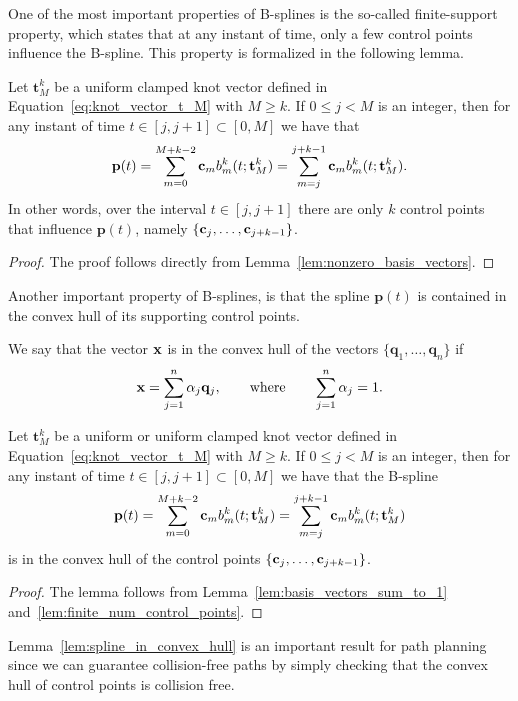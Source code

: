 One of the most important properties of B-splines is the so-called finite-support property, which states that at any instant of time, only a few control points influence the B-spline.  This property is formalized in the following lemma.
\begin{lemma}\label{lem:finite_num_control_points}
	Let $\mathbf{t}_M^k$ be a uniform clamped knot vector defined in Equation~\eqref{eq:knot_vector_t_M} with $M\geq k$. If $0\leq j < M$ is an integer, then for any instant of time $t\in[j, j+1]\subset [0, M]$ we have that
	\[
	\mathbf{p}(t) = \sum_{m=0}^{M+k-2} \mathbf{c}_m b_m^k(t; \mathbf{t}_M^k) = \sum_{m=j}^{j+k-1} \mathbf{c}_m b_m^k(t; \mathbf{t}_M^k).
	\]
	In other words, over the interval $t\in[j, j+1]$ there are only $k$ control points that influence $\mathbf{p}(t)$, namely
	$\{\mathbf{c}_j, \dots, \mathbf{c}_{j+k-1}\}$.
\end{lemma}
\begin{proof}
The proof follows directly from Lemma~\ref{lem:nonzero_basis_vectors}.	
\end{proof}



Another important property of B-splines, is that the spline $\mathbf{p}(t)$ is contained in the convex hull of its supporting control points.  
\begin{definition}
We say that the vector $\mathbf{x}$ is in the convex hull of the vectors $\{\mathbf{q}_1, \dots, \mathbf{q}_n\}$ if 
\[
\mathbf{x} = \sum_{j=1}^n \alpha_j \mathbf{q}_j, \qquad \text{where} \qquad \sum_{j=1}^n \alpha_j = 1.
\]	
\end{definition}

\begin{lemma}\label{lem:spline_in_convex_hull}
	Let $\mathbf{t}_M^k$ be a uniform or uniform clamped knot vector defined in Equation~\eqref{eq:knot_vector_t_M} with $M\geq k$. If $0\leq j < M$ is an integer, then for any instant of time $t\in[j, j+1]\subset [0, M]$ we have that the B-spline
	\[
	\mathbf{p}(t) = \sum_{m=0}^{M+k-2} \mathbf{c}_m b_m^k(t; \mathbf{t}_M^k) = \sum_{m=j}^{j+k-1} \mathbf{c}_m b_m^k(t; \mathbf{t}_M^k)
	\]
	is in the convex hull of the control points $\{\mathbf{c}_j, \dots, \mathbf{c}_{j+k-1}\}$.
\end{lemma}
\begin{proof}
	The lemma follows from Lemma~\ref{lem:basis_vectors_sum_to_1} and~\ref{lem:finite_num_control_points}.
\end{proof}
Lemma~\ref{lem:spline_in_convex_hull} is an important result for path planning since we can guarantee collision-free paths by simply checking that the convex hull of control points is collision free.


